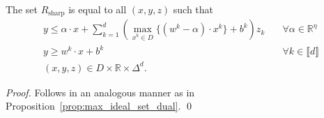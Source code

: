 \documentclass[smallextended]{svjour3}
\newcommand{\tx}{\widetilde{x}}
\newcommand{\Rsharp}{R_{\operatorname{sharp}}}
\begin{document}
\begin{proposition}\label{prop:max_sharp_set_dual}
The set $\Rsharp$ is equal to all $(x,y,z)$ such that
\begin{subequations}\label{eqn:max_sharp_set_dual}
\begin{align}
    y \leq \alpha \cdot x + \sum_{k=1}^d \left(\max_{x^k \in D}\{(w^k - \alpha) \cdot x^k\} + b^k\right)z_k&\quad\forall \alpha \in \mathbb{R}^\eta\label{eqn:max_sharp_set_dual-1}\\
    y \geq w^k \cdot x + b^k&\quad\forall k \in \llbracket d \rrbracket\label{eqn:max_sharp_set_dual-2}\\
    (x,y,z) \in D \times \mathbb{R} \times \Delta^d. \label{eqn:max_sharp_set_dual-3}
\end{align}
\end{subequations}
\end{proposition}
\begin{proof}

Follows in an analogous manner as in Proposition~\ref{prop:max_ideal_set_dual}.
\qed\end{proof}

\end{document}
